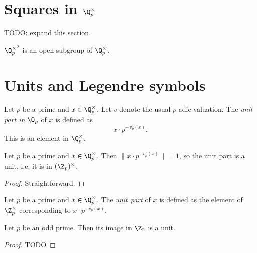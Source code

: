 \section[Squares in the p-adic units]{Squares in $\Q_p^{\times}$}\label{sec:padic_squares}

TODO: expand this section.

\begin{theorem}\label{thm:padic_squares_open}
\leanok
${\Q_p^\times}^2$ is an open subgroup of $\Q_p^\times$.
\end{theorem}

\section[Units and Legendre symbols]{Units and Legendre symbols}\label{sec:padic_legendre}

\begin{definition}\label{def:padicUnitPart_qp}
\leanok
Let $p$ be a prime and $x \in \Q_p^\times$. Let $v$ denote the usual $p$-adic valuation.
The \emph{unit part in $\Q_p$} of $x$ is defined as
\[x \cdot p^{-v_p(x)}.\]
This is an element in $\Q_p^\times$.
\end{definition}

\begin{lemma}\label{lem:padic_unit_part_unit}
\leanok
Let $p$ be a prime and $x \in \Q_p^\times$. Then $\|x \cdot p^{-v_p(x)}\| = 1$, so the
unit part is a unit, i.e. it is in $(\Z_p)^\times$.
\end{lemma}
\begin{proof}
Straightforward.
\end{proof}

\begin{definition}\label{def:padicUnitPart}
  \leanok
Let $p$ be a prime and $x \in \Q_p^\times$. The \emph{unit part} of $x$ is defined as the element
of $\Z_p^\times$ corresponding to $x \cdot p^{-v_p(x)}$.
\end{definition}

\begin{lemma}
	\label{lem:is_twoadic_unit_odd_p}
	\leanok
Let $p$ be an odd prime. Then its image in $\Z_2$ is a unit.
\end{lemma}

\begin{proof}
TODO
\end{proof}

